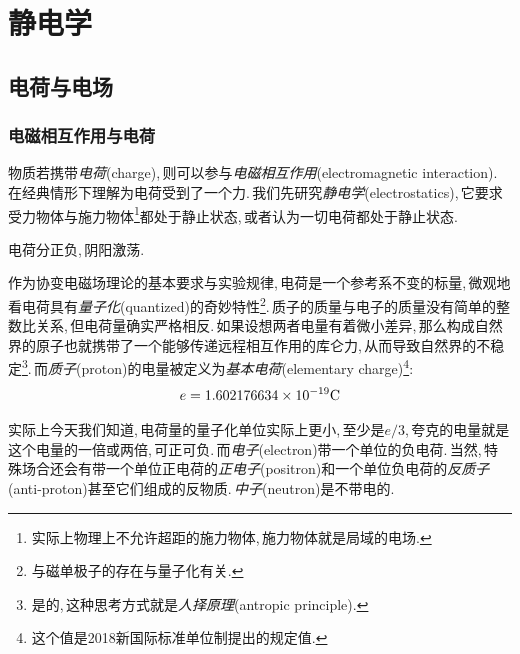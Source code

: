 \chapter{静电学}


\section{电荷与电场}

\subsection{电磁相互作用与电荷}
物质若携带\emph{电荷}(charge),\,则可以参与\emph{电磁相互作用}(electromagnetic interaction).\,在经典情形下理解为电荷受到了一个力.\,我们先研究\emph{静电学}(electrostatics),\,它要求受力物体与施力物体\footnote{实际上物理上不允许超距的施力物体,\,施力物体就是局域的电场.}都处于静止状态,\,或者认为一切电荷都处于静止状态.

电荷分正负,\,阴阳激荡.

作为协变电磁场理论的基本要求与实验规律,\,电荷是一个参考系不变的标量,\,微观地看电荷具有\emph{量子化}(quantized)的奇妙特性\footnote{与磁单极子的存在与量子化有关.}.\,质子的质量与电子的质量没有简单的整数比关系,\,但电荷量确实严格相反.\,如果设想两者电量有着微小差异,\,那么构成自然界的原子也就携带了一个能够传递远程相互作用的库仑力,\,从而导致自然界的不稳定\footnote{是的,\,这种思考方式就是\emph{人择原理}(antropic principle).}.\,而\emph{质子}(proton)的电量被定义为\emph{基本电荷}(elementary charge)\footnote{这个值是2018新国际标准单位制提出的规定值.}:
\[e=1.602176634\times 10^{-19} {\rm C}\]

实际上今天我们知道,\,电荷量的量子化单位实际上更小,\,至少是\(e/3\),\,夸克的电量就是这个电量的一倍或两倍,\,可正可负.\,而\emph{电子}(electron)带一个单位的负电荷.\,当然,\,特殊场合还会有带一个单位正电荷的\emph{正电子}(positron)和一个单位负电荷的\emph{反质子}(anti-proton)甚至它们组成的反物质.\,\emph{中子}(neutron)是不带电的.

